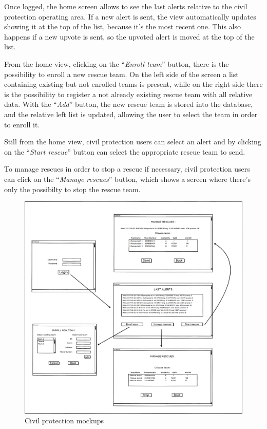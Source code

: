 \documentclass[a4paper,12pt]{report}
\begin{document}
Once logged, the home screen allows to see the last alerts relative to the civil protection operating area. If a new alert is sent, the view automatically updates showing it at the top of the list, because it's the most recent one. This also happens if a new upvote is sent, so the upvoted alert is moved at the top of the list.

From the home view, clicking on the ``\textit{Enroll team}'' button, there is the possibility to enroll a new rescue team. On the left side of the screen a list containing existing but not enrolled teams is present, while on the right side there is the possibility to register a not already existing rescue team with all relative data. With the ``\textit{Add}'' button, the new rescue team is stored into the database, and the relative left list is updated, allowing the user to select the team in order to enroll it.

Still from the home view, civil protection users can select an alert and by clicking on the ``\textit{Start rescue}'' button can select the appropriate rescue team to send.

To manage rescues in order to stop a rescue if necessary, civil protection users can click on the ``\textit{Manage rescues}'' button, which shows a screen where there's only the possibilty to stop the rescue team.

\begin{figure}[h]
\centering
\includegraphics[width=\textwidth]{figures/CPmockup.png}
\caption{Civil protection mockups}
\label{fig:CPmockup}
\end{figure}
\end{document}
